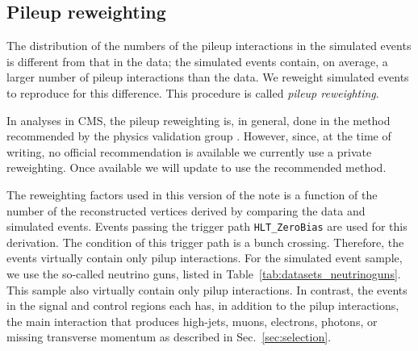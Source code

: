\begin{landscape}
\begin{table}[!h]
\tiny 
\label{tab:datasets_bkg}
\end{table}
\end{landscape}

\subsection{Pileup reweighting}


The distribution of the numbers of the pileup interactions in the
simulated events is different from that in the data; the simulated
events contain, on average, a larger number of pileup interactions than
the data. We reweight simulated events to reproduce  for this difference.
This procedure is called \textit{pileup reweighting}.

In analyses in CMS, the pileup reweighting is, in general, done in the
method recommended by the physics validation group
\cite{twiki-PdmVPileUpDescription}. However, since, at the time of
writing, no official recommendation is available we currently use a private reweighting.
Once available we will update to use the recommended method.

The reweighting factors used in this version of the note is a function
of the number of the reconstructed vertices derived by comparing the
data and simulated events. Events passing the trigger path
\verb!HLT_ZeroBias! are used for this derivation. The condition of this
trigger path is a bunch crossing. Therefore, the events virtually
contain only pilup interactions. For the simulated event sample, we use
the so-called neutrino guns, listed in
Table~\ref{tab:datasets_neutrinoguns}. This sample also virtually
contain only pilup interactions. In contrast, the events in the signal
and control regions each has, in addition to the pilup interactions, the
main interaction that produces high-\PT jets, muons, electrons, photons,
or missing transverse momentum as described in
Sec.~\ref{sec:selection}.


\begin{table}[!h]
\footnotesize 
\label{tab:datasets_neutrinoguns}
\end{table}

